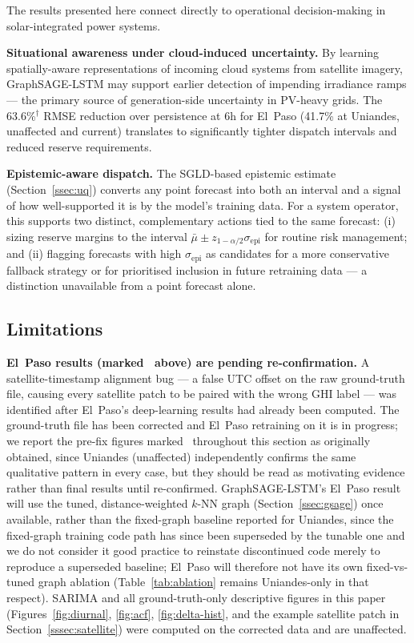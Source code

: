 The results presented here connect directly to operational decision-making in
solar-integrated power systems.

\textbf{Situational awareness under cloud-induced uncertainty.}
By learning spatially-aware representations of incoming cloud systems from
satellite imagery, GraphSAGE-LSTM may support earlier detection of impending
irradiance ramps --- the primary source of generation-side uncertainty in
PV-heavy grids. The 63.6\%$^\dagger$ RMSE reduction over persistence at 6h for
El~Paso (41.7\% at Uniandes, unaffected and current) translates to
significantly tighter dispatch intervals and reduced reserve requirements.

\textbf{Epistemic-aware dispatch.}
The SGLD-based epistemic estimate (Section~\ref{ssec:uq}) converts any point
forecast into both an interval and a signal of how well-supported it is by
the model's training data. For a system operator, this supports two
distinct, complementary actions tied to the same forecast: (i) sizing
reserve margins to the interval $\bar\mu \pm z_{1-\alpha/2}\sigma_\text{epi}$
for routine risk management; and (ii) flagging forecasts with high
$\sigma_\text{epi}$ as candidates for a more conservative fallback strategy
or for prioritised inclusion in future retraining data --- a distinction
unavailable from a point forecast alone.

\subsection{Limitations}

\textbf{El~Paso results (marked \dag\ above) are pending re-confirmation.}
A satellite-timestamp alignment bug --- a false UTC offset on the raw
ground-truth file, causing every satellite patch to be paired with the
wrong GHI label --- was identified after El~Paso's deep-learning results
had already been computed. The ground-truth file has been corrected and
El~Paso retraining on it is in progress; we report the pre-fix figures
marked \dag\ throughout this section as originally obtained, since Uniandes
(unaffected) independently confirms the same qualitative pattern in every
case, but they should be read as motivating evidence rather than final
results until re-confirmed. GraphSAGE-LSTM's El~Paso result will use the
tuned, distance-weighted $k$-NN graph (Section~\ref{ssec:gsage}) once
available, rather than the fixed-graph baseline reported for Uniandes,
since the fixed-graph training code path has since been superseded by the
tunable one and we do not consider it good practice to reinstate
discontinued code merely to reproduce a superseded baseline; El~Paso will
therefore not have its own fixed-vs-tuned graph ablation
(Table~\ref{tab:ablation} remains Uniandes-only in that respect). SARIMA
and all ground-truth-only descriptive figures in this paper
(Figures~\ref{fig:diurnal}, \ref{fig:acf}, \ref{fig:delta-hist}, and the
example satellite patch in Section~\ref{sssec:satellite}) were computed on
the corrected data and are unaffected.

